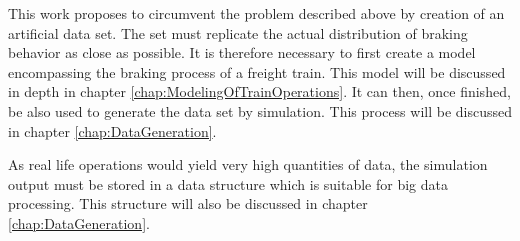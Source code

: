 \par\noindent
This work proposes to circumvent the problem described above by creation of an artificial data set. The set must replicate the actual distribution of braking behavior as close as possible. It is therefore necessary to first create a model encompassing the braking process of a freight train. This model will be discussed in depth in chapter \ref{chap:ModelingOfTrainOperations}. It can then, once finished, be also used to generate the data set by simulation. This process will be discussed in chapter \ref{chap:DataGeneration}.
\par
As real life operations would yield very high quantities of data, the simulation output must be stored in a data structure which is suitable for big data processing. This structure will also be discussed in chapter \ref{chap:DataGeneration}.